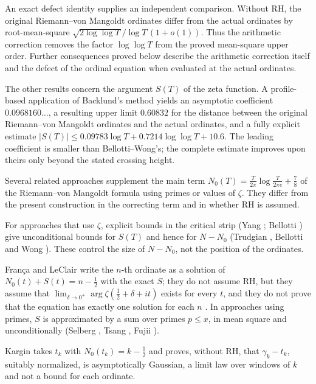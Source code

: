\documentclass[11pt,a4paper]{article}
\makeatletter
\numberwithin{equation}{section}
\DeclareRobustCommand{\CGcite}[2][]{\if\relax\detokenize{#1}\relax\cite{#2}\else\cite[#1]{#2}\fi}
\newcommand{\CG@getbib}[1]{\@ifundefined{CGBib@#1}{#1}{\csname CGBib@#1\endcsname}}
\DeclareRobustCommand{\CGcite}[2][]{\pdftooltip{\if\relax\detokenize{#1}\relax\cite{#2}\else\cite[#1]{#2}\fi}{\CG@getbib{#2}}}
\theoremstyle{definition}
\theoremstyle{remark}
\newcommand{\Nz}{N_0} %
\makeatother
\begin{document}
An exact defect identity supplies an independent comparison. Without RH, the original Riemann--von Mangoldt ordinates differ from the actual ordinates by root-mean-square $\sqrt{2\log\log T}/\log T\,(1+o(1))$. Thus the arithmetic correction removes the factor $\log\log T$ from the proved mean-square upper order. Further consequences proved below describe the arithmetic correction itself and the defect of the ordinal equation when evaluated at the actual ordinates.

The other results concern the argument $S(T)$ of the zeta function. A profile-based application of Backlund's method yields an asymptotic coefficient $0.0968160\ldots$, a resulting upper limit $0.60832$ for the distance between the original Riemann--von Mangoldt ordinates and the actual ordinates, and a fully explicit estimate $|S(T)|\le0.09783\log T+0.7214\log\log T+10.6$. The leading coefficient is smaller than Bellotti--Wong's; the complete estimate improves upon theirs only beyond the stated crossing height.

Several related approaches supplement the main term $\Nz(T)=\frac{T}{2\pi}\log\frac{T}{2\pi e}+\frac78$ of the Riemann--von Mangoldt formula using primes or values of $\zeta$. They differ from the present construction in the correcting term and in whether RH is assumed.

For approaches that use $\zeta$, explicit bounds in the critical strip (Yang \CGcite{Yang2024}; Bellotti \CGcite{Bellotti2024}) give unconditional bounds for $S(T)$ and hence for $N-\Nz$ (Trudgian \CGcite{Trudgian2012,Trudgian2014}, Bellotti and Wong \CGcite[Thm.~1.1, Cor.~1.5]{BellottiWong2025}). These control the size of $N-\Nz$, not the position of the ordinates.

Fran\c{c}a and LeClair \CGcite[eq.~(20)]{FrancaLeClair2015} write the $n$-th ordinate as a solution of $\Nz(t)+S(t)=n-\frac12$ with the exact $S$; they do not assume RH, but they assume that $\lim_{\delta\to0^+}\arg\zeta(\frac12+\delta+it)$ exists for every $t$, and they do not prove that the equation has exactly one solution for each $n$ \CGcite[\S9]{FrancaLeClair2015}. In approaches using primes, $S$ is approximated by a sum over primes $p\le x$, in mean square and unconditionally (Selberg \CGcite{Selberg1946a}, Tsang \CGcite{Tsang1984}, Fujii \CGcite{Fujii1974}).

Kargin \CGcite[Thm.~1.1]{Kargin2013} takes $t_k$ with $\Nz(t_k)=k-\frac12$ and proves, without RH, that $\gamma_k-t_k$, suitably normalized, is asymptotically Gaussian, a limit law over windows of $k$ and not a bound for each ordinate.
\end{document}
